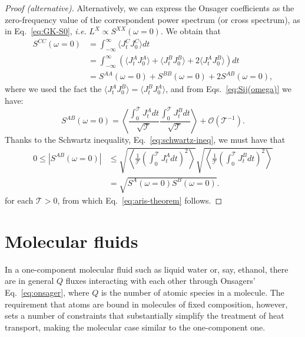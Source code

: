 \begin{LEtext}
\begin{proof}[Proof (alternative)]
Alternatively, we can express the Onsager coefficients as the zero-frequency value of the correspondent power spectrum (or cross spectrum), as in Eq.~\eqref{eq:GK-S0}, \emph{i.e.} $L^{X} \propto S^{XX}(\omega=0)$. We obtain that
\begin{align}
    S^{CC}(\omega=0) &= \int_{-\infty}^\infty \langle J^C_t J^C_0 \rangle dt \nonumber\\
        &=\int_{-\infty}^\infty \left(\langle J^A_t J^A_0 \rangle + \langle J^B_t J^B_0 \rangle + 2\langle J^A_t J^B_0 \rangle \right) dt  \nonumber\\
        &= S^{AA}(\omega=0) + S^{BB}(\omega=0) + 2 S^{AB}(\omega=0),
\end{align}
where we used the fact the $\langle J^A_t J^B_0 \rangle = \langle J^B_t J^A_0 \rangle$, and from Eqs.~\eqref{eq:Sij(omega)} we have:
\begin{equation}
    S^{AB}(\omega=0) = \left\langle \frac{\int_0^\mathcal{T} J^A_t dt}{\sqrt{\mathcal{T}}} \frac{\int_0^\mathcal{T} J^B_t dt}{\sqrt{\mathcal{T}}} \right\rangle + \mathcal{O}(\mathcal{T}^{-1}) .
\end{equation}
Thanks to the Schwartz inequality, Eq.~\eqref{eq:schwartz-ineq}, we must have that
\begin{equation}
\begin{aligned}
    0 \leq \left|S^{AB}(\omega=0)\right| &\leq \sqrt{\left\langle\frac{1}{\mathcal{T}}\left(\int_0^\mathcal{T} J^A_t dt\right)^2\right\rangle} \sqrt{\left\langle\frac{1}{\mathcal{T}}\left(\int_0^\mathcal{T} J^B_t dt\right)^2\right\rangle} \\
    &= \sqrt{S^{A}(\omega=0) S^{B}(\omega=0)} .
\end{aligned}
\end{equation}
for each $\mathcal{T}>0$, from which Eq.~\eqref{eq:aris-theorem} follows.
\end{proof}
\end{LEtext}

\section{Molecular fluids} \label{sec:MolecularFluids}
In a one-component molecular fluid such as liquid water or, say, ethanol, there are in general $Q$ fluxes interacting with each other through Onsagers' Eq.~\eqref{eq:onsager}, where $Q$ is the number of atomic species in a molecule. The requirement that atoms are bound in molecules of fixed composition, however, sets a number of constraints that substantially simplify the treatment of heat transport, making the molecular case similar to the one-component one.

